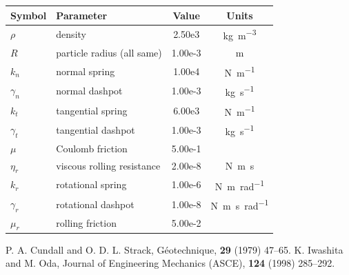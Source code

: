 \documentclass[a4paper,10pt,twocolumn]{ltjsarticle}
\begin{document}
\noindent\begin{minipage}{\columnwidth}\centering
  \begingroup
  \setlength{\tabcolsep}{3pt}
  \footnotesize
  \begin{threeparttable}
    \label{tab:params-compact}
    \begin{tabular}{@{}llSS@{}}
      \toprule
      Symbol     & Parameter                  & {Value} & {Units}                              \\
      \midrule
      $\rho$     & density                    & 2.50e3  & \si{\kilogram\per\meter\cubed}       \\
      $R$        & particle radius (all same) & 1.00e-3 & \si{\meter}                          \\
      \midrule
      $k_n$      & normal spring              & 1.00e4  & \si{\newton\per\meter}               \\
      $\gamma_n$ & normal dashpot             & 1.00e-3 & \si{\kilogram\per\second}            \\
      $k_t$      & tangential spring          & 6.00e3  & \si{\newton\per\meter}               \\
      $\gamma_t$ & tangential dashpot         & 1.00e-3 & \si{\kilogram\per\second}            \\
      $\mu$      & Coulomb friction           & 5.00e-1 & {}                                   \\
      \midrule
      $\eta_r$   & viscous rolling resistance & 2.00e-8 & \si{\newton\meter\second}            \\
      $k_r$      & rotational spring          & 1.00e-6 & \si{\newton\meter\per\radian}        \\
      $\gamma_r$ & rotational dashpot         & 1.00e-8 & \si{\newton\meter\second\per\radian} \\
      $\mu_r$    & rolling friction           & 5.00e-2 & {}                                   \\
      \bottomrule
    \end{tabular}
  \end{threeparttable}
  \endgroup
\end{minipage}


\par{}
\begin{thebibliography}{99}
  P. A. Cundall and O. D. L. Strack, Géotechnique, \textbf{29} (1979) 47--65.
  K. Iwashita and M. Oda, Journal of Engineering Mechanics (ASCE), \textbf{124} (1998) 285--292.
\end{thebibliography}
\end{document}
